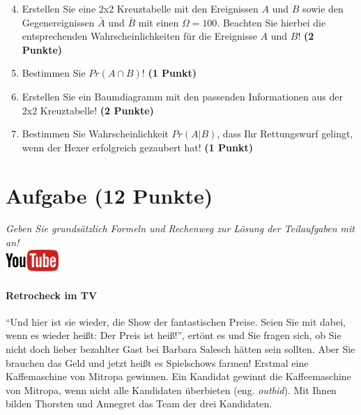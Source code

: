 \documentclass[a4paper, 9pt]{scrartcl}\usepackage[]{graphicx}\usepackage[]{xcolor}
\begin{document}
\begin{enumerate}
  \setcounter{enumi}{3}
\item Erstellen Sie eine 2x2 Kreuztabelle mit den Ereignissen $A$ und $B$
  sowie den Gegenereignissen $\bar{A}$ und $\bar{B}$ mit einen
  $\Omega = 100$. Beachten Sie hierbei die entsprechenden
  Wahrscheinlichkeiten f{\"u}r die Ereignisse $A$ und $B$! \textbf{(2 Punkte)}
\item Bestimmen Sie $Pr(A \cap B)$! \textbf{(1 Punkt)}
\item Erstellen Sie ein Baumdiagramm mit den passenden Informationen aus der 2x2
  Kreuztabelle! \textbf{(2 Punkte)}
\item Bestimmen Sie Wahrscheinlichkeit $Pr(A|B)$, dass Ihr Rettungswurf gelingt, wenn
  der Hexer erfolgreich gezaubert hat! \textbf{(1 Punkt)}
\end{enumerate}

  
\clearpage

\section{Aufgabe \hfill (12 Punkte)}

\textit{Geben Sie grunds{\"a}tzlich Formeln und Rechenweg zur L{\"o}sung der
  Teilaufgaben mit an!} \\[1Ex]

\hfill\href{https://youtu.be/9DQKaXdxT_g}{\includegraphics[width =
  2cm]{img/youtube}} %
\hspace{2Ex}

\paragraph{Retrocheck im TV}



"`Und hier ist sie wieder, die Show der fantastischen Preise. Seien Sie mit
dabei, wenn es wieder hei{\ss}t: Der Preis ist hei{\ss}!"', ert{\"o}nt es und Sie
fragen sich, ob Sie nicht doch lieber bezahlter Gast bei Barbara Salesch
h{\"a}tten sein sollten. Aber Sie brauchen das Geld und jetzt hei{\ss}t es
Spielschows farmen! Erstmal eine Kaffemaschine von Mitropa
gewinnen. Ein Kandidat gewinnt die Kaffeemaschine von Mitropa, wenn nicht alle
Kandidaten {\"u}berbieten (eng. \textit{outbid}). Mit Ihnen bilden
Thorsten und Annegret das Team der drei Kandidaten.
\end{document}
